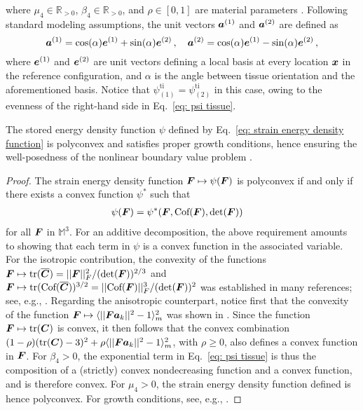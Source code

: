 where $\mu_4 \in \mathbb{R}_{> 0}$, $\beta_4 \in \mathbb{R}_{> 0}$, and $\rho \in [0,1]$ are material parameters \cite{holzapfel2005determination}. Following standard modeling assumptions, the unit vectors $\boldsymbol{a}^{(1)}$ and $\boldsymbol{a}^{(2)}$ are defined as
\begin{equation}    
    \boldsymbol{a}^{(1)} = \cos(\alpha) \boldsymbol{e}^{(1)} + \sin(\alpha)\boldsymbol{e}^{(2)}\,, \quad 
    \boldsymbol{a}^{(2)} = \cos(\alpha) \boldsymbol{e}^{(1)} - \sin(\alpha)\boldsymbol{e}^{(2)}\,,
\end{equation}
where $\boldsymbol{e}^{(1)}$ and $\boldsymbol{e}^{(2)}$ are unit vectors defining a local basis at every location $\boldsymbol{x}$ in the reference configuration, and $\alpha$ is the angle between tissue orientation and the aforementioned basis. Notice that $\psi_{(1)}^\text{ti} = \psi_{(2)}^\text{ti}$ in this case, owing to the evenness of the right-hand side in Eq.~\eqref{eq: psi tissue}.

\begin{prop}
The stored energy density function $\psi$ defined by Eq.~\eqref{eq: strain energy density function} is polyconvex and satisfies proper growth conditions, hence ensuring the well-posedness of the nonlinear boundary value problem \cite{Ciarlet1988,ball2002some}.
\end{prop}

\begin{proof} 
The strain energy density function $\boldsymbol{F} \mapsto \psi(\boldsymbol{F})$ is polyconvex if and only if there exists a convex function $\psi^*$ such that
\begin{align}
    \psi(\boldsymbol{F}) & = \psi^*(\boldsymbol{F}, \text{Cof}(\boldsymbol{F}), \det(\boldsymbol{F}))
\end{align}
for all $\boldsymbol{F}$ in $\mathbb{M}^3$. For an additive decomposition, the above requirement amounts to showing that each term in $\psi$ is a convex function in the associated variable. For the isotropic contribution, the convexity of the functions $\boldsymbol{F} \mapsto \textnormal{tr}(\overline{\boldsymbol{C}}) = \vert \vert \boldsymbol{F} \vert \vert_F^2/(\det(\boldsymbol{F}))^{2/3}$ and $\boldsymbol{F} \mapsto \textnormal{tr}(\text{Cof}(\overline{\boldsymbol{C}}))^{3/2} = \vert \vert \text{Cof}(\boldsymbol{F}) \vert \vert_F^3/(\det(\boldsymbol{F}))^2$ was established in many references; see, e.g., \cite{hartmann2003polyconvexity,schroder2003invariant}. Regarding the anisotropic counterpart, notice first that the convexity of the function $\boldsymbol{F} \mapsto \langle \vert \vert \boldsymbol{F} \boldsymbol{a}_k \vert \vert ^2-1 \rangle^2_m$ was shown in \cite{balzani2006polyconvex}. Since the function $\boldsymbol{F} \mapsto \textnormal{tr}(\boldsymbol{C})$ is convex, it then follows that the convex combination $(1-\rho)(\textnormal{tr}(\boldsymbol{C})-3)^2 + \rho \langle \vert \vert \boldsymbol{F} \boldsymbol{a}_k \vert \vert ^2-1 \rangle^2_m$, with $\rho \geq 0$,  also defines a convex function in $\boldsymbol{F}$. For $\beta_4 > 0$, the exponential term in Eq.~\eqref{eq: psi tissue} is thus the composition of a (strictly) convex nondecreasing function and a convex function, and is therefore convex. For $\mu_4 > 0$, the strain energy density function defined is hence polyconvex. For growth conditions, see, e.g., \cite{ball2002some}.
\end{proof}


